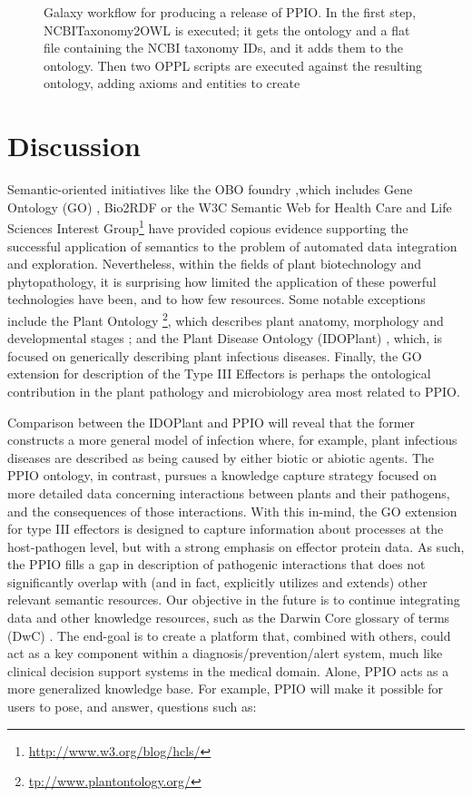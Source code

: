 \documentclass[sw]{iosart2c}
\newcommand{\myurl}[1]{\footnote{\url{#1}}}
\begin{document}
\begin{figure*}
\caption{Galaxy workflow for producing a release of PPIO. In the first step, NCBITaxonomy2OWL is executed; it gets the ontology and a flat file containing the NCBI taxonomy IDs, and it adds them to the ontology. Then two OPPL scripts are executed against the resulting ontology, adding axioms and entities to create }\label{fig:galaxy-workflow}
\end{figure*}

\section{Discussion}\label{sec:discussion}

Semantic-oriented initiatives like the OBO foundry \cite{Smith},which includes Gene Ontology (GO) \cite{Gene}, Bio2RDF \cite{RDF} or the W3C Semantic Web for Health Care and Life Sciences Interest Group\myurl{http://www.w3.org/blog/hcls/} have provided copious evidence supporting the successful application of semantics to the problem of automated data integration and exploration. Nevertheless, within the fields of plant biotechnology and phytopathology, it is surprising how limited the application of these powerful technologies have been, and to how few resources. Some notable exceptions include the Plant Ontology \myurl{tp://www.plantontology.org/}, which describes plant anatomy, morphology and developmental stages \cite{PO}; and the Plant Disease Ontology (IDOPlant) \cite{Walls} \cite{IDO}, which, is focused on generically describing plant infectious diseases. Finally, the GO extension for description of the Type III Effectors \cite{Lindeberg} is perhaps the ontological contribution in the plant pathology and microbiology area most related to PPIO.

Comparison between the IDOPlant and PPIO will reveal that the former constructs a more general model of infection where, for example, plant infectious diseases are described as being caused by either biotic or abiotic agents. The PPIO ontology, in contrast, pursues a knowledge capture strategy focused on more detailed data concerning interactions between plants and their pathogens, and the consequences of those interactions. With this in-mind, the GO extension for type III effectors is designed to capture information about processes at the host-pathogen level, but with a strong emphasis on effector protein data. As such, the PPIO fills a gap in description of pathogenic interactions that does not significantly overlap with (and in fact, explicitly utilizes and extends) other relevant semantic resources.  Our objective in the future is to continue integrating data and other knowledge resources, such as the Darwin Core glossary of terms (DwC) \cite{Wieczorek2013}. The end-goal is to create a platform that, combined with others, could act as a key component within a diagnosis/prevention/alert system, much like clinical decision support systems in the medical domain. Alone, PPIO acts as a more generalized knowledge base. For example, PPIO will make it possible for users to pose, and answer, questions such as:
\end{document}
